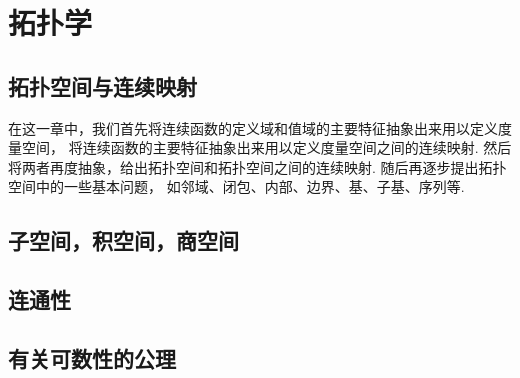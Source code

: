 \part{拓扑学}
\chapter{拓扑空间与连续映射}


在这一章中，我们首先将连续函数的定义域和值域的主要特征抽象出来用以定义度量空间，
将连续函数的主要特征抽象出来用以定义度量空间之间的连续映射.
然后将两者再度抽象，给出拓扑空间和拓扑空间之间的连续映射.
随后再逐步提出拓扑空间中的一些基本问题，
如邻域、闭包、内部、边界、基、子基、序列等.



\begingroup
\def\T{\mathfrak T}%
\def\oT{\overline{\T}}%





\def\B{\mathscr{B}}%
\def\S{\mathscr{S}}%




\chapter{子空间，积空间，商空间}

\chapter{连通性}

\chapter{有关可数性的公理}

